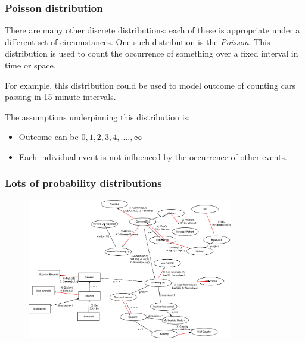 \documentclass{beamer}
\begin{document}
	
	\begin{frame}
		\frametitle{Poisson distribution}
		
		There are many other discrete distributions: each of these is appropriate under a different set of circumstances. One such distribution is the \textit{Poisson}. This distribution is used to count the occurrence of something over a fixed interval in time or space.
		
		\vspace{0.5cm}
		
		For example, this distribution could be used to model outcome of counting cars passing in 15 minute intervals.
		
		\vspace{0.5cm}
		
		The assumptions underpinning this distribution is:
		
		\begin{itemize}
			\item Outcome can be $0, 1, 2, 3, 4, ...., \infty$
			\item Each individual event is not influenced by the occurrence of other events.
		\end{itemize}
		
	\end{frame}
	
	\begin{frame}
		\frametitle{Lots of probability distributions}
		
		\begin{figure}[h]
			\centerline{\includegraphics[width=0.8\textwidth]{figures/Distributions_nexusOfRelations.pdf}}
		\end{figure}
	
	\end{frame}
	
\end{document}
